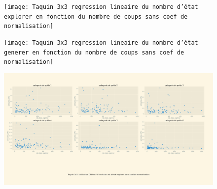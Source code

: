 \documentclass[a4paper, 12pt]{article}
\begin{document}
\begin{figure}[H]
    \centering
    \texttt{[image: Taquin 3x3 regression lineaire du nombre d'état explorer en fonction du nombre de coups sans coef de normalisation]}
\end{figure}
\begin{figure}[H]
    \centering
    \texttt{[image: Taquin 3x3 regression lineaire du nombre d'état generer en fonction du nombre de coups sans coef de normalisation]}
\end{figure}
\begin{figure}[H]
    \centering
    \includegraphics[width=\textwidth]{Taquin 3x3 utilisation CPU en fct du nb d'etat explorer sans coef de normalisation}
\end{figure}
\end{document}
